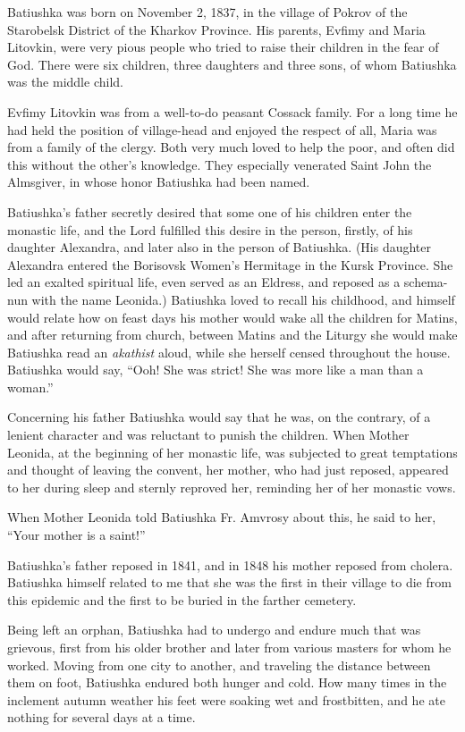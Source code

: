 Batiushka was born on November 2, 1837, in the village of Pokrov of the Starobelsk District of the Kharkov Province. His parents, Evfimy and Maria Litovkin, were very pious people who tried to raise their children in the fear of God. There were six children, three daughters and three sons, of whom Batiushka was the middle child.

Evfimy Litovkin was from a well-to-do peasant Cossack family. For a long time he had held the position of village-head and enjoyed the respect of all, Maria was from a family of the clergy. Both very much loved to help the poor, and often did this without the other's knowledge. They especially venerated Saint John the Almsgiver, in whose honor Batiushka had been named.

Batiushka's father secretly desired that some one of his children enter the monastic life, and the Lord fulfilled this desire in the person, firstly, of his daughter Alexandra, and later also in the person of Batiushka. (His daughter Alexandra entered the Borisovsk Women's Hermitage in the Kursk Province. She led an exalted spiritual life, even served as an Eldress, and reposed as a schema-nun with the name Leonida.) Batiushka loved to recall his childhood, and himself would relate how on feast days his mother would wake all the children for Matins, and after returning from church, between Matins and the Liturgy she would make Batiushka read an \textit{akathist} aloud, while she herself censed throughout the house. Batiushka would say, ``Ooh! She was strict! She was more like a man than a woman.''

Concerning his father Batiushka would say that he was, on the contrary, of a lenient character and was reluctant to punish the children. When Mother Leonida, at the beginning of her monastic life, was subjected to great temptations and thought of leaving the convent, her mother, who had just reposed, appeared to her during sleep and sternly reproved her, reminding her of her monastic vows.

When Mother Leonida told Batiushka Fr. Amvrosy about this, he said to her, ``Your mother is a saint!''

Batiushka's father reposed in 1841, and in 1848 his mother reposed from cholera. Batiushka himself related to me that she was the first in their village to die from this epidemic and the first to be buried in the farther cemetery.

Being left an orphan, Batiushka had to undergo and endure much that was grievous, first from his older brother and later from various masters for whom he worked. Moving from one city to another, and traveling the distance between them on foot, Batiushka endured both hunger and cold. How many times in the inclement autumn weather his feet were soaking wet and frostbitten, and he ate nothing for several days at a time.

